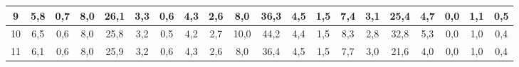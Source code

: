 \begin{sidewaystable}[]
\begin{tabular}{|c|c|c|c|c|c|c|c|c|c|c|c|c|c|c|c|c|c|c|c|}
    9  & 5,8                                              & 0,7                                              & 8,0                                              & 26,1                                             & 3,3                                              & 0,6                                              & 4,3                                              & 2,6                                              & 8,0                                              & 36,3                                             & 4,5                                              & 1,5                                              & 7,4                                              & 3,1                                              & 25,4                                             & 4,7                                              & 0,0                                              & 1,1                                              & 0,5                                              \\ \hline
    10 & 6,5                                              & 0,6                                              & 8,0                                              & 25,8                                             & 3,2                                              & 0,5                                              & 4,2                                              & 2,7                                              & 10,0                                             & 44,2                                             & 4,4                                              & 1,5                                              & 8,3                                              & 2,8                                              & 32,8                                             & 5,3                                              & 0,0                                              & 1,0                                              & 0,4                                              \\ \hline
    11 & 6,1                                              & 0,6                                              & 8,0                                              & 25,9                                             & 3,2                                              & 0,6                                              & 4,3                                              & 2,6                                              & 8,0                                              & 36,4                                             & 4,5                                              & 1,5                                              & 7,7                                              & 3,0                                              & 21,6                                             & 4,0                                              & 0,0                                              & 1,0                                              & 0,4                                              \\ \hline

\end{tabular}
\end{sidewaystable}
